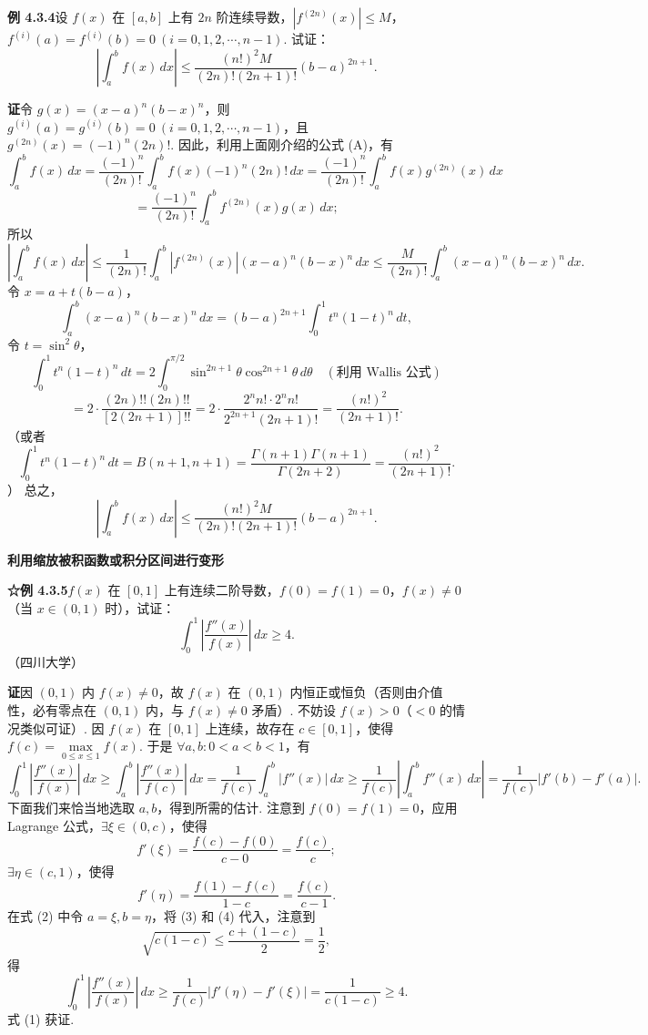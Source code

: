\documentclass[UTF8,12pt,a4paper,fontset=fandol]{ctexart}
\begin{document}
\noindent\textbf{例 4.3.4}\quad 设 $f(x)$ 在 $[a,b]$ 上有 $2n$ 阶连续导数，$|f^{(2n)}(x)|\le M$，$f^{(i)}(a)=f^{(i)}(b)=0\ (i=0,1,2,\cdots,n-1)$. 试证：
\[
\left|\int_a^b f(x)\,dx\right|
\le\frac{(n!)^2M}{(2n)!(2n+1)!}(b-a)^{2n+1}.
\]

\noindent\textbf{证}\quad 令 $g(x)=(x-a)^n(b-x)^n$，则 $g^{(i)}(a)=g^{(i)}(b)=0\ (i=0,1,2,\cdots,n-1)$，且 $g^{(2n)}(x)=(-1)^n(2n)!$. 因此，利用上面刚介绍的公式 (A)，有
\[
\int_a^b f(x)\,dx
=\frac{(-1)^n}{(2n)!}\int_a^b f(x)(-1)^n(2n)!\,dx
=\frac{(-1)^n}{(2n)!}\int_a^b f(x)g^{(2n)}(x)\,dx
\]
\[
=\frac{(-1)^n}{(2n)!}\int_a^b f^{(2n)}(x)g(x)\,dx;
\]
所以
\[
\left|\int_a^b f(x)\,dx\right|
\le\frac1{(2n)!}\int_a^b|f^{(2n)}(x)|(x-a)^n(b-x)^n\,dx
\le\frac{M}{(2n)!}\int_a^b(x-a)^n(b-x)^n\,dx.
\]
令 $x=a+t(b-a)$，
\[
\int_a^b(x-a)^n(b-x)^n\,dx
=(b-a)^{2n+1}\int_0^1t^n(1-t)^n\,dt,
\]
令 $t=\sin^2\theta$，
\[
\int_0^1t^n(1-t)^n\,dt
=2\int_0^{\pi/2}\sin^{2n+1}\theta\cos^{2n+1}\theta\,d\theta
\quad(\text{利用 Wallis 公式})
\]
\[
=2\cdot\frac{(2n)!!(2n)!!}{[2(2n+1)]!!}
=2\cdot\frac{2^n n!\cdot2^n n!}{2^{2n+1}(2n+1)!}
=\frac{(n!)^2}{(2n+1)!}.
\]
（或者
\[
\int_0^1t^n(1-t)^n\,dt
=B(n+1,n+1)
=\frac{\Gamma(n+1)\Gamma(n+1)}{\Gamma(2n+2)}
=\frac{(n!)^2}{(2n+1)!}.
\]
）
总之，
\[
\left|\int_a^b f(x)\,dx\right|
\le\frac{(n!)^2M}{(2n)!(2n+1)!}(b-a)^{2n+1}.
\]

\noindent\textbf{利用缩放被积函数或积分区间进行变形}

\noindent\textbf{☆例 4.3.5}\quad $f(x)$ 在 $[0,1]$ 上有连续二阶导数，$f(0)=f(1)=0$，$f(x)\ne0$（当 $x\in(0,1)$ 时），试证：
\[
\int_0^1\left|\frac{f''(x)}{f(x)}\right|\,dx\ge4.
\tag{1}
\]
（四川大学）

\noindent\textbf{证}\quad 因 $(0,1)$ 内 $f(x)\ne0$，故 $f(x)$ 在 $(0,1)$ 内恒正或恒负（否则由介值性，必有零点在 $(0,1)$ 内，与 $f(x)\ne0$ 矛盾）. 不妨设 $f(x)>0$（$<0$ 的情况类似可证）. 因 $f(x)$ 在 $[0,1]$ 上连续，故存在 $c\in[0,1]$，使得 $f(c)=\max\limits_{0\le x\le1}f(x)$. 于是 $\forall a,b:0<a<b<1$，有
\[
\int_0^1\left|\frac{f''(x)}{f(x)}\right|\,dx
\ge\int_a^b\left|\frac{f''(x)}{f(c)}\right|\,dx
=\frac1{f(c)}\int_a^b|f''(x)|\,dx
\ge\frac1{f(c)}\left|\int_a^b f''(x)\,dx\right|
=\frac1{f(c)}|f'(b)-f'(a)|.
\tag{2}
\]
下面我们来恰当地选取 $a,b$，得到所需的估计. 注意到 $f(0)=f(1)=0$，应用 Lagrange 公式，$\exists\xi\in(0,c)$，使得
\[
f'(\xi)=\frac{f(c)-f(0)}{c-0}=\frac{f(c)}c;
\tag{3}
\]
$\exists\eta\in(c,1)$，使得
\[
f'(\eta)=\frac{f(1)-f(c)}{1-c}=\frac{f(c)}{c-1}.
\tag{4}
\]
在式 (2) 中令 $a=\xi,b=\eta$，将 (3) 和 (4) 代入，注意到
\[
\sqrt{c(1-c)}\le\frac{c+(1-c)}2=\frac12,
\]
得
\[
\int_0^1\left|\frac{f''(x)}{f(x)}\right|\,dx
\ge\frac1{f(c)}|f'(\eta)-f'(\xi)|
=\frac1{c(1-c)}\ge4.
\]
式 (1) 获证.
\end{document}
